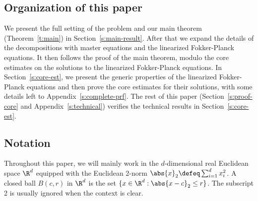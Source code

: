 \documentclass{amsart}
\begin{document}
\subsection{Organization of this paper}

We present the full setting of the problem and our main theorem (Theorem~\ref{t:main}) in Section~\ref{s:main-result}.
After that we expand the details of the decompositions with master equations and the linearized Fokker-Planck equations.
It then follows the proof of the main theorem, modulo the core estimates on the solutions to the linearized Fokker-Planck equations.
In Section~\ref{s:core-est}, we present the generic properties of the linearized Fokker-Planck equations and then prove the core estimates for their solutions, with some details left to Appendix~\ref{s:complete-prf}.
The rest of this paper (Section~\ref{s:proof-core} and Appendix~\ref{s:technical}) verifies the technical results in Section~\ref{s:core-est}.


\subsection{Notation}

Throughout this paper, we will mainly work in the $d$-dimensional real Euclidean space $\R^d$ equipped with the Euclidean 2-norm $\abs{x}_2 \defeq \sum_{i=1}^d x_i^2$. 
A closed ball $B(c,r)$ in $\R^d$ is the set $\{x \in \R^d: \abs{x-c}_2 \le r\}$. 
The subscript 2 is usually ignored when the context is clear.
\end{document}
